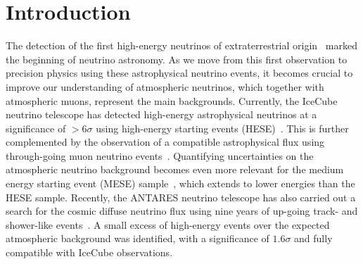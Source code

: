 \documentclass[aps,prd,showpacs,letterpaper,onecolumn,longbibliography,superscriptaddress,notitlepage,nofootinbib]{revtex4-1}%
\begin{document}
\date{\today}

\maketitle


\section{Introduction}
\label{sec:intro}

The detection of the first high-energy neutrinos of extraterrestrial origin~\cite{Aartsen:2013bka} marked the beginning of neutrino astronomy. As we move from this first observation to precision physics using these astrophysical neutrino events, it becomes crucial to improve our understanding of atmospheric neutrinos, which together with atmospheric muons, represent the main backgrounds. Currently, the IceCube neutrino telescope has detected high-energy astrophysical neutrinos at a significance of $> 6 \sigma$ using high-energy starting events (HESE)~\cite{Aartsen:2013jdh, Aartsen:2014gkd, Aartsen:2015zva, Aartsen:2017mau}. This is further complemented by the observation of a compatible astrophysical flux using through-going muon neutrino events~\cite{Aartsen:2015rwa, Aartsen:2016xlq}. Quantifying uncertainties on the atmospheric neutrino background becomes even more relevant for the medium energy starting event (MESE) sample~\cite{Aartsen:2014muf}, which extends to lower energies than the HESE sample. Recently, the ANTARES neutrino telescope has also carried out a search for the cosmic diffuse neutrino flux using nine years of up-going track- and shower-like events~\cite{Albert:2017nsd}. A small excess of high-energy events over the expected atmospheric background was identified, with a significance of $1.6 \sigma$ and fully compatible with IceCube observations.
\end{document}
